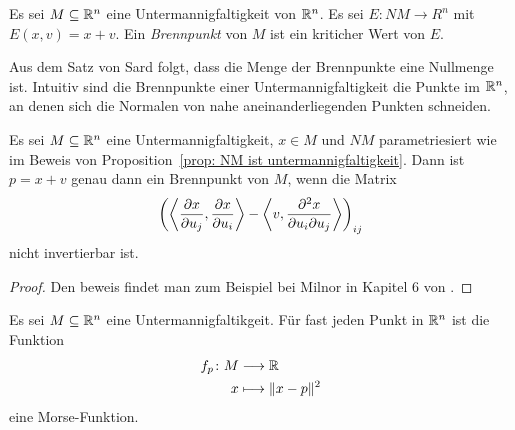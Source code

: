\begin{definition}[Brennpunkt]
    \label{def: brennpunkt}
    Es sei $M \subseteq { \mathbb R }^n$ eine Untermannigfaltigkeit von ${ \mathbb R }^n$. Es sei $E \colon NM \to R^n$ 
    mit $E (x, v) = x + v$. Ein \textit{Brennpunkt} von $M$ ist ein kriticher Wert von $E$.
\end{definition}

\begin{remark}
    Aus dem Satz von Sard folgt, dass die Menge der Brennpunkte eine Nullmenge ist.
    Intuitiv sind die Brennpunkte einer Untermannigfaltigkeit die Punkte im ${ \mathbb R }^n$, an denen sich
    die Normalen von nahe aneinanderliegenden Punkten schneiden.
\end{remark}

\begin{lemma}
    \label{lemma: char. von Brennpunkten}
    Es sei $M \subseteq { \mathbb R }^n$ eine Untermannigfaltigkeit, $x \in M$ und $NM$ parametriesiert wie im 
    Beweis von Proposition~\ref{prop: NM ist untermannigfaltigkeit}. Dann ist $p = x + v$ genau 
    dann ein Brennpunkt von $M$, wenn die Matrix 
    \[
        \left( \left\langle \pderive[x]{u_j}, \pderive[x]{u_i} \right\rangle - 
        \left\langle v , \pdderive[x]{u_i}{u_j} \right\rangle \right)_{ij}
    \]
    nicht invertierbar ist.
\end{lemma}

\begin{proof}
    Den beweis findet man zum Beispiel bei Milnor in Kapitel 6 von \cite{milnor}.
\end{proof}

\begin{prop}
    \label{prop: existenz morse-funktionen}
    Es sei $M \subseteq { \mathbb R }^n$ eine Untermannigfaltikgeit. Für fast jeden Punkt in ${ \mathbb R }^n$ ist
    die Funktion
    \begin{align*}
        f_p \colon M & \longrightarrow { \mathbb R } \\
        x & \longmapsto \| x - p \|^2
    \end{align*}
    eine Morse-Funktion.
\end{prop}

